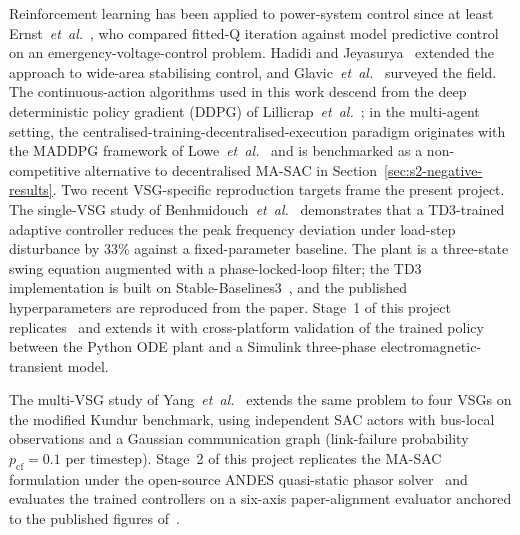 \documentclass{unnc-fyp}
\begin{document}
Reinforcement learning has been applied to power-system control
since at least Ernst~\emph{et~al.}~\cite{ernst2009rl}, who
compared fitted-Q iteration against model predictive control on
an emergency-voltage-control problem.
Hadidi and Jeyasurya~\cite{hadidi2013ml} extended the approach
to wide-area stabilising control, and Glavic~\emph{et~al.}~%
\cite{glavic2017rl} surveyed the field.
The continuous-action algorithms used in this work descend from
the deep deterministic policy gradient (DDPG) of
Lillicrap~\emph{et~al.}~\cite{lillicrap2016ddpg}; in the
multi-agent setting, the centralised-training-decentralised-execution
paradigm originates with the MADDPG framework of
Lowe~\emph{et~al.}~\cite{lowe2017maddpg} and is benchmarked as a
non-competitive alternative to decentralised MA-SAC in
Section~\ref{sec:s2-negative-results}.
Two recent VSG-specific reproduction targets frame the
present project.
The single-VSG study of
Benhmidouch~\emph{et~al.}~\cite{benhmidouch2024td3} demonstrates
that a TD3-trained adaptive controller reduces the peak frequency
deviation under load-step disturbance by $33\%$ against a
fixed-parameter baseline.
The plant is a three-state swing equation augmented with a
phase-locked-loop filter; the TD3 implementation is built on
Stable-Baselines3~\cite{raffin2021sb3}, and the published
hyperparameters are reproduced from the paper.
Stage~1 of this project replicates~\cite{benhmidouch2024td3} and
extends it with cross-platform validation of the trained policy
between the Python ODE plant and a Simulink three-phase
electromagnetic-transient model.

The multi-VSG study of
Yang~\emph{et~al.}~\cite{yang2023ddic} extends the same problem
to four VSGs on the modified Kundur benchmark, using independent
SAC actors with bus-local observations and a Gaussian
communication graph (link-failure probability
$p_{\mathrm{cf}} = 0.1$ per timestep).
Stage~2 of this project replicates the MA-SAC formulation under
the open-source ANDES quasi-static phasor solver~\cite{cui2021andes}
and evaluates the trained controllers on a six-axis
paper-alignment evaluator anchored to the published figures
of~\cite{yang2023ddic}.
\end{document}
